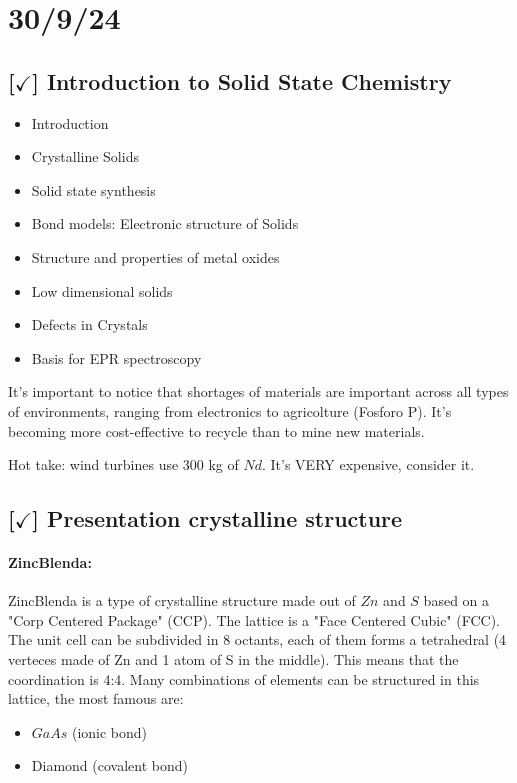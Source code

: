 \section{30/9/24}

\subsection{[$\checkmark$] Introduction to Solid State Chemistry}

\begin{itemize}
	\item Introduction
	\item Crystalline Solids
	\item Solid state synthesis
	\item Bond models: Electronic structure of Solids
	\item Structure and properties of metal oxides
	\item Low dimensional solids
	\item Defects in Crystals
	\item Basis for EPR spectroscopy
\end{itemize}

It's important to notice that shortages of materials are important across all types of environments, ranging from electronics to agricolture (Fosforo P). It's becoming more cost-effective to recycle than to mine new materials.

Hot take: wind turbines use 300 kg of $Nd$. It's VERY expensive, consider it.

\subsection{[$\checkmark$] Presentation crystalline structure}

\paragraph{ZincBlenda:} ZincBlenda is a type of crystalline structure made out of $Zn$ and $S$ based on a "Corp Centered Package" (CCP). The lattice is a "Face Centered Cubic" (FCC). The unit cell can be subdivided in 8 octants, each of them forms a tetrahedral (4 verteces made of Zn and 1 atom of S in the middle). This means that the coordination is 4:4. Many combinations of elements can be structured in this lattice, the most famous are:
\begin{itemize}
	\item $GaAs$ (ionic bond)
	\item Diamond (covalent bond)
\end{itemize}

